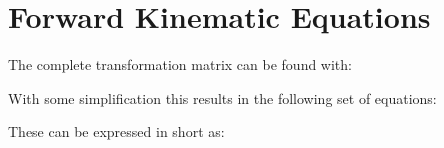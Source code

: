 \chapter{Forward Kinematic Equations} \label{sec:FWKinEqSteps}
The complete transformation matrix can be found with:



%
%

With some simplification this results in the following set of equations:

%



These can be expressed in short as:

